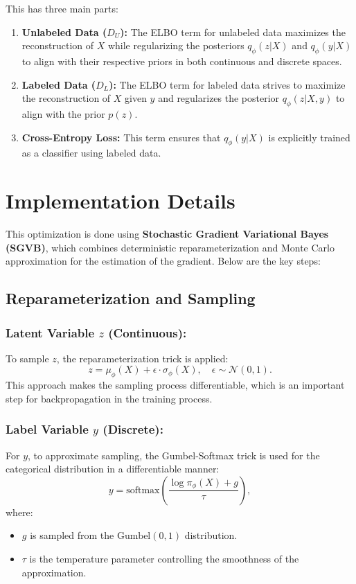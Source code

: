 \documentclass{article}
\begin{document}
This has three main parts:
\begin{enumerate}
    \item \textbf{Unlabeled Data ($D_U$):} The ELBO term for unlabeled data maximizes the reconstruction of $X$ while regularizing the posteriors $q_\phi(z|X)$ and $q_\phi(y|X)$ to align with their respective priors in both continuous and discrete spaces.
    \item \textbf{Labeled Data ($D_L$):} The ELBO term for labeled data strives to maximize the reconstruction of $X$ given $y$ and regularizes the posterior $q_\phi(z|X, y)$ to align with the prior $p(z)$.
    \item \textbf{Cross-Entropy Loss:} This term ensures that $q_\phi(y|X)$ is explicitly trained as a classifier using labeled data.
\end{enumerate}



\section*{Implementation Details}

This optimization is done using \textbf{Stochastic Gradient Variational Bayes (SGVB)}, which combines deterministic reparameterization and Monte Carlo approximation for the estimation of the gradient. Below are the key steps:

\subsection*{Reparameterization and Sampling}

\subsubsection*{Latent Variable $z$ (Continuous):}
To sample $z$, the reparameterization trick is applied:
\[
z = \mu_\phi(X) + \epsilon \cdot \sigma_\phi(X), \quad \epsilon \sim \mathcal{N}(0, 1).
\]
This approach makes the sampling process differentiable, which is an important step for backpropagation in the training process.

\subsubsection*{Label Variable $y$ (Discrete):}
For $y$, to approximate sampling, the Gumbel-Softmax trick is used for the categorical distribution in a differentiable manner:
\[
y = \text{softmax}\left(\frac{\log \pi_\phi(X) + g}{\tau}\right),
\]
where:
\begin{itemize}
    \item $g$ is sampled from the $\text{Gumbel}(0, 1)$ distribution.
    \item $\tau$ is the temperature parameter controlling the smoothness of the approximation.
\end{itemize}
\end{document}
